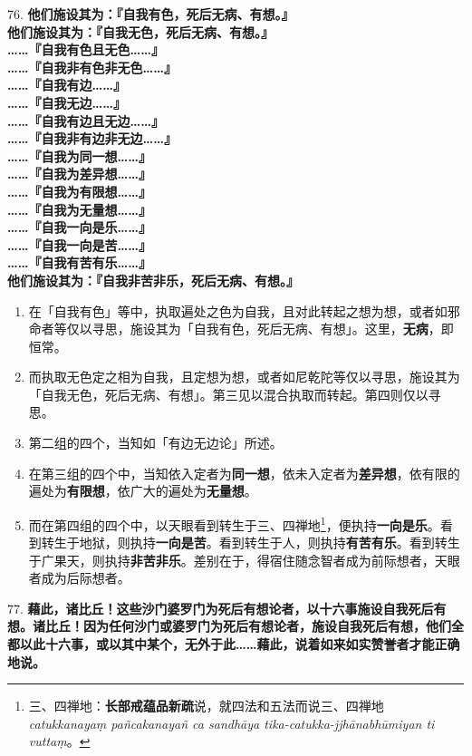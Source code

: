 {\Large 76.} \textbf{他们施设其为：『自我有色，死后无病、有想。』}\\
\textbf{他们施设其为：『自我无色，死后无病、有想。』}\\
\textbf{……『自我有色且无色……』}\\
\textbf{……『自我非有色非无色……』}\\
\textbf{……『自我有边……』}\\
\textbf{……『自我无边……』}\\
\textbf{……『自我有边且无边……』}\\
\textbf{……『自我非有边非无边……』}\\
\textbf{……『自我为同一想……』}\\
\textbf{……『自我为差异想……』}\\
\textbf{……『自我为有限想……』}\\
\textbf{……『自我为无量想……』}\\
\textbf{……『自我一向是乐……』}\\
\textbf{……『自我一向是苦……』}\\
\textbf{……『自我有苦有乐……』}\\
\textbf{他们施设其为：『自我非苦非乐，死后无病、有想。』}\\

\begin{enumerate}\item 在「自我有色」等中，执取遍处之色为自我，且对此转起之想为想，或者如邪命者等仅以寻思，施设其为「自我有色，死后无病、有想」。这里，\textbf{无病}，即恒常。
\item 而执取无色定之相为自我，且定想为想，或者如尼乾陀等仅以寻思，施设其为「自我无色，死后无病、有想」。第三见以混合执取而转起。第四则仅以寻思。
\item 第二组的四个，当知如「有边无边论」所述。
\item 在第三组的四个中，当知依入定者为\textbf{同一想}，依未入定者为\textbf{差异想}，依有限的遍处为\textbf{有限想}，依广大的遍处为\textbf{无量想}。
\item 而在第四组的四个中，以天眼看到转生于三、四禅地\footnote{三、四禅地：\textbf{长部戒蕴品新疏}说，就四法和五法而说三、四禅地 \textit{catukkanayaṃ pañcakanayañ ca sandhāya tika-catukka-jjhānabhūmiyan ti vuttaṃ}。}，便执持\textbf{一向是乐}。看到转生于地狱，则执持\textbf{一向是苦}。看到转生于人，则执持\textbf{有苦有乐}。看到转生于广果天，则执持\textbf{非苦非乐}。差别在于，得宿住随念智者成为前际想者，天眼者成为后际想者。\end{enumerate}

{\Large 77.} \textbf{藉此，诸比丘！这些沙门婆罗门为死后有想论者，以十六事施设自我死后有想。诸比丘！因为任何沙门或婆罗门为死后有想论者，施设自我死后有想，他们全都以此十六事，或以其中某个，无外于此……藉此，说着如来如实赞誉者才能正确地说。}


